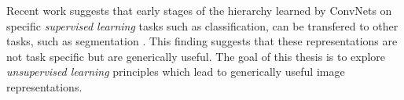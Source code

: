 Recent work suggests that early stages of the hierarchy learned by ConvNets 
on specific \emph{supervised learning} tasks such as classification, can be transfered 
to other tasks, such as segmentation \cite{yosinski2014}. This finding suggests 
that these representations are not task specific but are generically useful. 
The goal of this thesis is to explore \emph{unsupervised learning} principles which lead
to generically useful image representations.    







